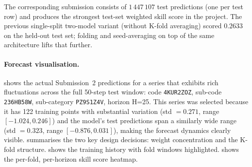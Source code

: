 The corresponding submission consists of $1\,447\,107$ test predictions (one per test row) and produces the strongest test-set weighted skill score in the project. The previous single-split two-model variant (without K-fold averaging) scored $0.2633$ on the held-out test set; folding and seed-averaging on top of the same architecture lifts that further.

\paragraph{Forecast visualisation.}
 shows the actual Submission~2 predictions for a series that exhibits rich fluctuations across the full 50-step test window: code \texttt{4KUR2ZOZ}, sub-code \texttt{236HB58W}, sub-category \texttt{PZ9S1Z4V}, horizon H=25. This series was selected because it has 122 training points with substantial variation (std $= 0.271$, range $[-1.024, 0.246]$) and the model's test predictions span a similarly wide range (std $= 0.323$, range $[-0.876, 0.031]$), making the forecast dynamics clearly visible.
 summarises the two key design decisions: weight concentration and the K-fold structure.  shows the training history with fold windows highlighted.  shows the per-fold, per-horizon skill score heatmap.

